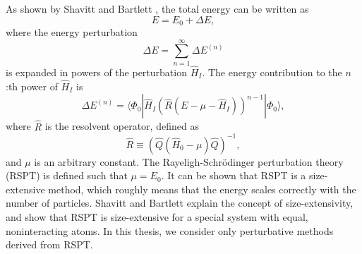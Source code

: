 \documentclass[a4paper,12pt]{report}
\begin{document}
 As shown by Shavitt and Bartlett \cite{bartlett_book}, the total energy can be written as 
\begin{equation}
  E = E_{0} + \Delta E,
\end{equation}
where the energy perturbation
\begin{equation}
  \Delta E = \sum_{n=1}^{\infty }\Delta E^{(n)}
\end{equation}
is expanded in powers of the perturbation $\hat{H}_{I}$. The energy contribution to the $n$:th power of $\hat{H}_{I}$ is
\begin{equation} \label{eq:pert_contr_n}
  \Delta E^{(n)} = \langle \Phi_{0}|\hat{H}_{I}\left( \hat{R}\left( E-\mu - \hat{H}_{I}\right)\right)^{n-1}|\Phi_{0} \rangle ,
\end{equation}
where $\hat{R}$ is the resolvent operator, defined as
\begin{equation} \label{eq:resolvent}
  \hat{R} \equiv \left( \hat{Q}\left( \hat{H}_{0}-\mu \right) \hat{Q}\right)^{-1},
\end{equation}
and $\mu $ is an arbitrary constant. The Rayeligh-Schr{\"o}dinger perturbation theory (RSPT) is defined such that $\mu = E_{0}$. It can be shown that RSPT is a size-extensive method, which roughly means that the energy scales correctly with the number of particles. Shavitt and Bartlett \cite{bartlett_book} explain the concept of size-extensivity, and show that RSPT is size-extensive for a special system with equal, noninteracting atoms. In this thesis, we consider only perturbative methods derived from RSPT.

\end{document}
